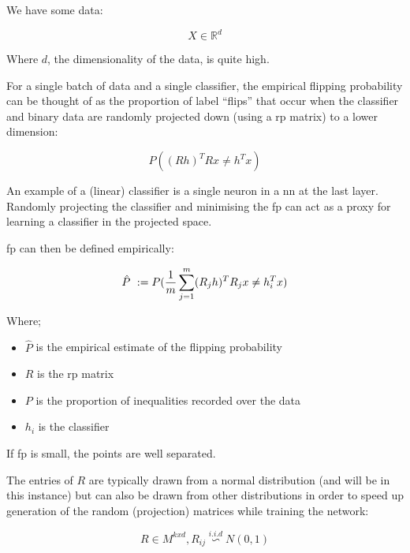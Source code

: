 We have some data:

\begin{equation}
X \in \mathds{R}^d 
\end{equation}

Where $d$, the dimensionality of the data, is quite high. \bigskip

For a single batch of data and a single classifier, the empirical flipping probability can be thought of as the proportion of label \enquote{flips} that occur when the classifier and binary data are randomly projected down (using a \gls{rp} matrix) to a lower dimension:

\begin{equation}
P((R h)^T Rx \neq h^{T}x)  
\end{equation}

An example of a (linear) classifier is a single neuron in a \gls{nn} at the last layer. Randomly projecting the classifier and minimising the \gls{fp} can act as a proxy for learning a classifier in the projected space. \smallskip

\gls{fp} can then be defined empirically:

\begin{equation}
\hat{P}\ := \\ P(\frac{1}{m}\sum_{j = 1}^m (R_j h)^T R_{j}x \neq h_i^{T}x)  
\end{equation}

Where;  \smallskip

\begin{itemize}
\item $\hat{P}$ is the empirical estimate of the flipping probability  
\item $R$ is the \gls{rp} matrix  
\item $P$ is the proportion of inequalities recorded over the data 
\item $h_i$ is the classifier  
\end{itemize}

If  \gls{fp} is small, the points are well separated. \bigskip

The entries of $R$ are typically drawn from a normal distribution (and will be in this instance) but can also be drawn from other distributions in order to speed up generation of the random (projection) matrices while training the network:

\begin{equation}
R \in M^{kxd}, R_{ij} \stackrel{i.i.d}{\backsim} N(0,1) 
\end{equation}

